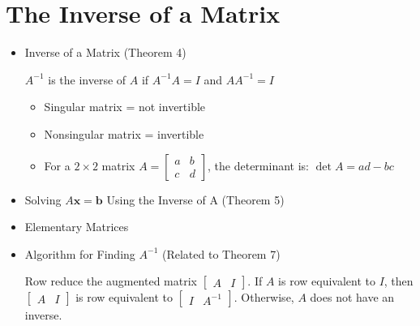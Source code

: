 \documentclass[10pt]{book}
\newenvironment{boxdef}{\begin{mdframed}[backgroundcolor=gray!30,linewidth=0pt,nobreak=true]}{\end{mdframed}}
\newcommand{\vect}[1]{\ensuremath{\boldsymbol{\mathbf{#1}}}}
\newcommand{\Axb}{A\vect{x}=\vect{b}}
\begin{document}
\newpage


\section{The Inverse of a Matrix}
\begin{itemize}
	\item Inverse of a Matrix (Theorem 4)
		\begin{boxdef}
			$A^{-1}$ is the inverse of $A$ if $A^{-1}A=I$ and $AA^{-1}=I$
		\end{boxdef}
		\begin{itemize}
			\item Singular matrix = not invertible
			\item Nonsingular matrix = invertible
			\item For a $2\times 2$ matrix $A=\begin{bmatrix}a&b\\c&d\end{bmatrix}$, the determinant is: $\det A = ad-bc$
		\end{itemize}
	\item Solving $\Axb$ Using the Inverse of A (Theorem 5)
	\item Elementary Matrices
	\item Algorithm for Finding $A^{-1}$ (Related to Theorem 7)
	\begin{boxdef}
		Row reduce the augmented matrix $\begin{bmatrix}A&I\end{bmatrix}$. If $A$ is row equivalent to $I$, then $\begin{bmatrix}A&I\end{bmatrix}$ is row equivalent to $\begin{bmatrix}I&A^{-1}\end{bmatrix}$. Otherwise, $A$ does not have an inverse.
	\end{boxdef}
\end{itemize}
\end{document}
